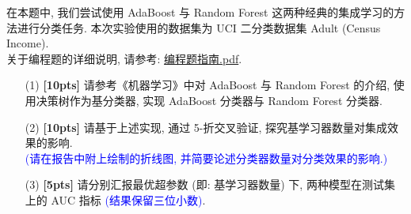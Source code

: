 \documentclass[a4paper,UTF8]{article}
\numberwithin{equation}{section}
\theoremstyle{definition}
\begin{document}
在本题中, 我们尝试使用 AdaBoost 与 Random Forest 这两种经典的集成学习的方法进行分类任务. 本次实验使用的数据集为 UCI 二分类数据集 Adult (Census Income).\\关于编程题的详细说明, 请参考: \href{https://www.lamda.nju.edu.cn/ML2024Spring/homework/HW5/guide.pdf}{编程题指南.pdf}.

\begin{enumerate}
    \item [(1)] \textbf{[10pts]} 请参考《机器学习》中对 AdaBoost 与 Random Forest 的介绍, 使用决策树作为基分类器, 实现 AdaBoost 分类器与 Random Forest 分类器.
    \item [(2)] \textbf{[10pts]} 请基于上述实现, 通过 5-折交叉验证, 探究基学习器数量对集成效果的影响.\\\textcolor{blue}{(请在报告中附上绘制的折线图, 并简要论述分类器数量对分类效果的影响.)}
    \item [(3)] \textbf{[5pts]} 请分别汇报最优超参数 (即: 基学习器数量) 下, 两种模型在测试集上的 AUC 指标 \textcolor{blue}{(结果保留三位小数)}.
\end{enumerate}
\end{document}
